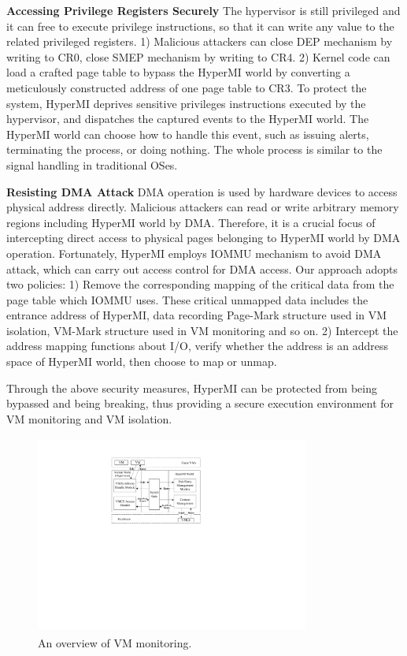 \documentclass[conference]{IEEEtran}
\begin{document}
\textbf{Accessing Privilege Registers Securely}
The hypervisor is still privileged and it can free to execute privilege instructions, so that it can write any value to the related privileged registers. 1) Malicious attackers can close DEP mechanism by writing to CR0, close SMEP mechanism by writing to CR4. 2) Kernel code can load a crafted page table to bypass the HyperMI world by converting a meticulously constructed address of one page table to CR3.
To protect the system, HyperMI deprives sensitive privileges instructions executed by the hypervisor, and dispatches the captured events to the HyperMI world. The HyperMI world can choose how to handle this event, such as issuing alerts, terminating the process, or doing nothing. The whole process is similar to the signal handling in traditional OSes.

\textbf{Resisting DMA Attack}
DMA operation is used by hardware devices to access physical address directly. Malicious attackers can read or write arbitrary memory regions including HyperMI world by DMA. Therefore, it is a crucial focus of intercepting direct access to physical pages belonging to HyperMI world by DMA operation. 
Fortunately, HyperMI employs IOMMU mechanism to avoid DMA attack, which can carry out access control for DMA access. Our approach adopts two policies: 1) Remove the corresponding mapping of the critical data from the page table which IOMMU uses. These critical unmapped data includes the entrance address of HyperMI, data recording Page-Mark structure used in VM isolation, VM-Mark structure used in VM monitoring and so on. 2) Intercept the address mapping functions about I/O, verify whether the address is an address space of HyperMI world, then choose to map or unmap.


Through the above security measures, HyperMI can be protected from being bypassed and being breaking, thus providing a secure execution environment for VM monitoring and VM isolation.














\iffalse
\begin{figure}
\centerline{\includegraphics[width=9cm,height=6.5cm]{pdfvmcs4.pdf}}%
\caption{An overview of VM monitoring.} \label{fig4}
\end{figure}
\end{document}
